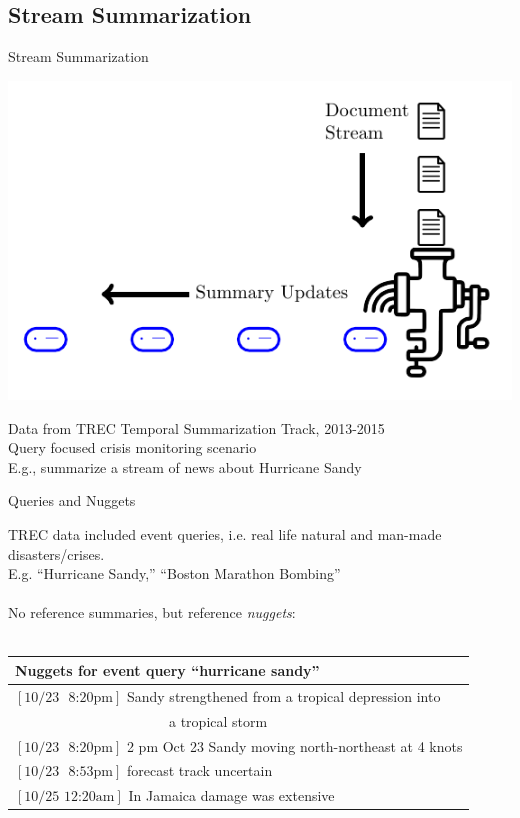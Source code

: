 \subsection{Stream Summarization}
\begin{frame}{Stream Summarization}

    {
        \begin{center}
    \includegraphics[scale=.8]{2_feature_based_models_of_salience/image_texs/stream_sum/stream_sum.pdf}
\end{center}
}

Data from TREC Temporal Summarization Track, 2013-2015\\
Query focused crisis monitoring scenario \\
E.g., summarize a stream of news about Hurricane Sandy

\end{frame}

\begin{frame}{Queries and Nuggets}

    TREC data included event queries, i.e. real life natural and man-made
    disasters/crises.\\
    E.g. ``Hurricane Sandy,'' ``Boston Marathon Bombing''\\
~\\
No reference summaries, but reference \textit{nuggets}: ~\\
~\\

        \begin{tabular}{l}
         \textbf{Nuggets for event query ``hurricane sandy''} \\
        \hline
    $[\textrm{10/23 ~8:20pm}]$ Sandy strengthened from a tropical depression into\\
    ~~~~~~~~~~~~~~~~~~~~~~a tropical storm \\
    $[\textrm{10/23 ~8:20pm}]$ 2 pm Oct 23 Sandy moving north-northeast at 4 
    knots \\
    $[\textrm{10/23 ~8:53pm}]$ forecast track uncertain \\
    $[\textrm{10/25 12:20am}]$ In Jamaica damage was extensive\\
\end{tabular}

\end{frame}

